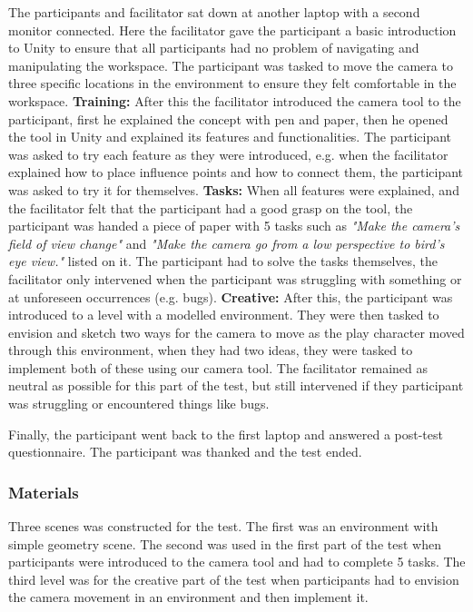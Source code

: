 The participants and facilitator sat down at another laptop with a second monitor connected. Here the facilitator gave the participant a basic introduction to Unity to ensure that all participants had no problem of navigating and manipulating the workspace. The participant was tasked to move the camera to three specific locations in the environment to ensure they felt comfortable in the workspace. \textbf{Training:} After this the facilitator introduced the camera tool to the participant, first he explained the concept with pen and paper, then he opened the tool in Unity and explained its features and functionalities. The participant was asked to try each feature as they were introduced, e.g. when the facilitator explained how to place influence points and how to connect them, the participant was asked to try it for themselves. \textbf{Tasks:} When all features were explained, and the facilitator felt that the participant had a good grasp on the tool, the participant was handed a piece of paper with 5 tasks such as \textit{"Make the camera's field of view change"} and \textit{"Make the camera go from a low perspective to bird's eye view."} listed on it. The participant had to solve the tasks themselves, the facilitator only intervened when the participant was struggling with something or at unforeseen occurrences (e.g. bugs). \textbf{Creative:} After this, the participant was introduced to a level with a modelled environment. They were then tasked to envision and sketch two ways for the camera to move as the play character moved through this environment, when they had two ideas, they were tasked to implement both of these using our camera tool. The facilitator remained as neutral as possible for this part of the test, but still intervened if they participant was struggling or encountered things like bugs.

Finally, the participant went back to the first laptop and answered a post-test questionnaire. The participant was thanked and the test ended.

\subsubsection{Materials}
Three scenes was constructed for the test. The first was an environment with simple geometry scene. The second was used in the first part of the test when participants were introduced to the camera tool and had to complete 5 tasks. The third level was for the creative part of the test when participants had to envision the camera movement in an environment and then implement it. 

